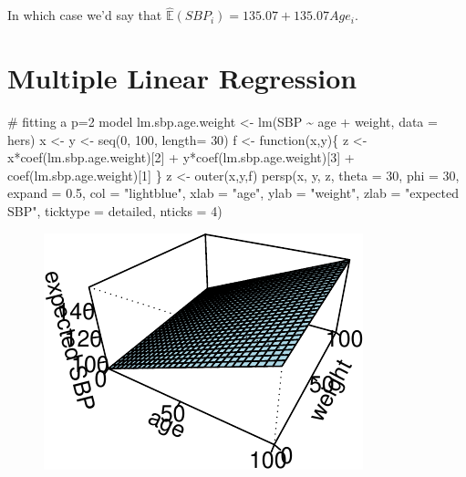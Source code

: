 \documentclass[
  letterpaper,
  DIV=11,
  numbers=noendperiod]{scrreport}
\newenvironment{Shaded}{\begin{snugshade}}{\end{snugshade}}
\newcommand{\AttributeTok}[1]{\textcolor[rgb]{0.40,0.45,0.13}{#1}}
\newcommand{\CommentTok}[1]{\textcolor[rgb]{0.37,0.37,0.37}{#1}}
\newcommand{\ControlFlowTok}[1]{\textcolor[rgb]{0.00,0.23,0.31}{#1}}
\newcommand{\DecValTok}[1]{\textcolor[rgb]{0.68,0.00,0.00}{#1}}
\newcommand{\FloatTok}[1]{\textcolor[rgb]{0.68,0.00,0.00}{#1}}
\newcommand{\FunctionTok}[1]{\textcolor[rgb]{0.28,0.35,0.67}{#1}}
\newcommand{\NormalTok}[1]{\textcolor[rgb]{0.00,0.23,0.31}{#1}}
\newcommand{\OtherTok}[1]{\textcolor[rgb]{0.00,0.23,0.31}{#1}}
\newcommand{\SpecialCharTok}[1]{\textcolor[rgb]{0.37,0.37,0.37}{#1}}
\newcommand{\StringTok}[1]{\textcolor[rgb]{0.13,0.47,0.30}{#1}}
\begin{document}
In which case we'd say that
\(\hat{\mathbb E}(SBP_i) = 135.07 + 135.07 Age_i\).

\hypertarget{multiple-linear-regression}{%
\section{Multiple Linear Regression}\label{multiple-linear-regression}}

\begin{Shaded}
\begin{Highlighting}[]
\CommentTok{\# fitting a p=2 model}
\NormalTok{lm.sbp.age.weight }\OtherTok{\textless{}{-}} \FunctionTok{lm}\NormalTok{(SBP }\SpecialCharTok{\textasciitilde{}}\NormalTok{ age }\SpecialCharTok{+}\NormalTok{ weight, }\AttributeTok{data =}\NormalTok{ hers)}
\NormalTok{x }\OtherTok{\textless{}{-}}\NormalTok{ y }\OtherTok{\textless{}{-}} \FunctionTok{seq}\NormalTok{(}\DecValTok{0}\NormalTok{, }\DecValTok{100}\NormalTok{, }\AttributeTok{length=} \DecValTok{30}\NormalTok{)}
\NormalTok{f }\OtherTok{\textless{}{-}} \ControlFlowTok{function}\NormalTok{(x,y)\{ z }\OtherTok{\textless{}{-}}\NormalTok{ x}\SpecialCharTok{*}\FunctionTok{coef}\NormalTok{(lm.sbp.age.weight)[}\DecValTok{2}\NormalTok{] }\SpecialCharTok{+}\NormalTok{ y}\SpecialCharTok{*}\FunctionTok{coef}\NormalTok{(lm.sbp.age.weight)[}\DecValTok{3}\NormalTok{] }\SpecialCharTok{+} \FunctionTok{coef}\NormalTok{(lm.sbp.age.weight)[}\DecValTok{1}\NormalTok{] \}}
\NormalTok{z }\OtherTok{\textless{}{-}} \FunctionTok{outer}\NormalTok{(x,y,f)}
\FunctionTok{persp}\NormalTok{(x, y, z, }\AttributeTok{theta =} \DecValTok{30}\NormalTok{, }\AttributeTok{phi =} \DecValTok{30}\NormalTok{, }\AttributeTok{expand =} \FloatTok{0.5}\NormalTok{, }\AttributeTok{col =} \StringTok{"lightblue"}\NormalTok{, }\AttributeTok{xlab =} \StringTok{"age"}\NormalTok{, }\AttributeTok{ylab =} \StringTok{"weight"}\NormalTok{, }\AttributeTok{zlab =} \StringTok{"expected SBP"}\NormalTok{, }\AttributeTok{ticktype =} \StringTok{\textquotesingle{}detailed\textquotesingle{}}\NormalTok{, }\AttributeTok{nticks =} \DecValTok{4}\NormalTok{)}
\end{Highlighting}
\end{Shaded}

\begin{figure}[H]

{\centering \includegraphics{week1/week1_files/figure-pdf/unnamed-chunk-7-1.pdf}

}

\end{figure}
\end{document}
